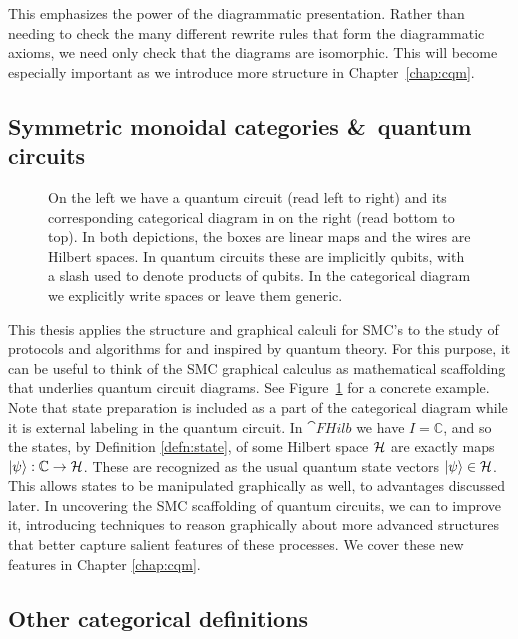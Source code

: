 \noindent This emphasizes the power of the diagrammatic presentation.  Rather than needing to check the many different rewrite rules that form the diagrammatic axioms, we need only check that the diagrams are isomorphic.  This will become especially important as we introduce more structure in Chapter~\ref{chap:cqm}.

\subsection{Symmetric monoidal categories \&\ quantum circuits}
\label{sec:smcqc}
\begin{figure}[t]

\caption[Comparison of quantum circuits and symmetric monoidal diagrams]{On the left we have a quantum circuit (read left to right) and its corresponding categorical diagram in  on the right (read bottom to top). In both depictions, the boxes are linear maps and the wires are Hilbert spaces. In quantum circuits these are implicitly qubits, with a slash used to denote products of qubits. In the categorical diagram we explicitly write spaces or leave them generic.}
\label{fig:QCDSMC}
\end{figure}

This thesis applies the structure and graphical calculi for SMC's to the study of protocols and algorithms for and inspired by quantum theory. For this purpose, it can be useful to think of the SMC graphical calculus as mathematical scaffolding that underlies quantum circuit diagrams. See Figure~\ref{fig:QCDSMC} for a concrete example. Note that state preparation is included as a part of the categorical diagram while it is external labeling in the quantum circuit. In $\cat{FHilb}$ we have $I=\mathbb{C}$, and so the states, by Definition \ref{defn:state}, of some Hilbert space $\mathcal{H}$ are exactly maps $| \psi \rangle:\mathbb{C}\to\mathcal{H}$. These are recognized as the usual quantum state vectors $| \psi \rangle\in\mathcal{H}$. This allows states to be manipulated graphically as well, to advantages discussed later. In uncovering the SMC scaffolding of quantum circuits, we can to improve it, introducing techniques to reason graphically about more advanced structures that better capture salient features of these processes. We cover these new features in Chapter \ref{chap:cqm}.

\subsection{Other categorical definitions}

